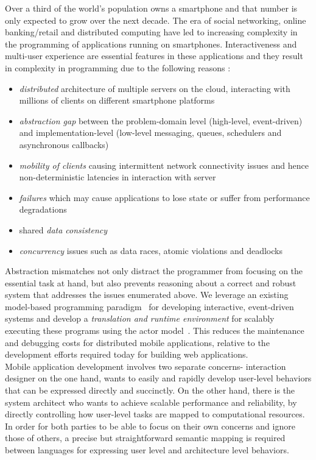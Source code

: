 \documentclass[a4paper]{article}
\begin{document}
Over a third of the world's population owns a smartphone \cite{smartphonestat} and that number is only expected to grow over the next decade. The era of social networking, online banking/retail and distributed computing have led to increasing complexity in the programming of applications running on smartphones. Interactiveness and multi-user experience are essential features in these applications and they result in complexity in programming due to the following reasons \cite{Milicevic}:
\begin{itemize}
\item \emph{distributed} architecture of multiple servers on the cloud, interacting with millions of clients on different smartphone platforms
\item \emph{abstraction gap} between the problem-domain level (high-level, event-driven) and implementation-level (low-level messaging, queues, schedulers and asynchronous callbacks)
\item \emph{mobility of clients} causing intermittent network connectivity issues and hence non-deterministic latencies in interaction with server 
\item \emph{failures} which may cause applications to lose state or suffer from performance degradations
\item shared \emph{data consistency}
\item \emph{concurrency} issues such as data races, atomic violations and deadlocks
\end{itemize}

Abstraction mismatches not only distract the programmer from focusing on the essential task at hand, but also prevents reasoning about a correct and robust system that addresses the issues enumerated above. We leverage an existing model-based programming paradigm~\cite{Milicevic} for developing interactive, event-driven systems and develop a \emph{translation and runtime environment} for scalably executing these programs using the actor model~\cite{actors}. This reduces the maintenance and debugging costs for distributed mobile applications, relative to the development efforts required today for building web applications. \\

Mobile application development involves two separate concerns- interaction designer on the one hand, wants to easily and rapidly develop user-level behaviors that can be expressed directly and succinctly. On the other hand, there is the system architect who wants to achieve scalable performance and reliability, by directly controlling how user-level tasks are mapped to computational resources. In order for both parties to be able to focus on their own concerns and ignore those of others, a precise but straightforward semantic mapping is required between languages for expressing user level and architecture level behaviors. \\
\end{document}
